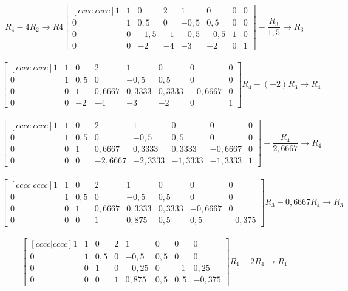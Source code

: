 \\
\[
    R_4 - 4R_2\to R4
    \begin{bmatrix}[cccc|cccc]
        1 & 1 & 0    & 2  & 1    & 0    & 0 & 0 \\
        0 & 1 & 0,5  & 0  & -0,5 & 0,5  & 0 & 0 \\
        0 & 0 & -1,5 & -1 & -0,5 & -0,5 & 1 & 0 \\
        0 & 0 & -2   & -4 & -3   & -2   & 0 & 1
    \end{bmatrix}
    -\frac{R_3}{1,5}\to R_3
\]
\\
\[
    \begin{bmatrix}[cccc|cccc]
        1 & 1 & 0   & 2      & 1      & 0      & 0       & 0 \\
        0 & 1 & 0,5 & 0      & -0,5   & 0,5    & 0       & 0 \\
        0 & 0 & 1   & 0,6667 & 0,3333 & 0,3333 & -0,6667 & 0 \\
        0 & 0 & -2  & -4     & -3     & -2     & 0       & 1
    \end{bmatrix}
    R_4 - (-2)R_3\to R_4
\]
\\
\[
    \begin{bmatrix}[cccc|cccc]
        1 & 1 & 0   & 2       & 1       & 0       & 0       & 0 \\
        0 & 1 & 0,5 & 0       & -0,5    & 0,5     & 0       & 0 \\
        0 & 0 & 1   & 0,6667  & 0,3333  & 0,3333  & -0,6667 & 0 \\
        0 & 0 & 0   & -2,6667 & -2,3333 & -1,3333 & -1,3333 & 1
    \end{bmatrix}
    -\frac{R_4}{2,6667}\to R_4
\]
\\
\[
    \begin{bmatrix}[cccc|cccc]
        1 & 1 & 0   & 2      & 1      & 0      & 0       & 0      \\
        0 & 1 & 0,5 & 0      & -0,5   & 0,5    & 0       & 0      \\
        0 & 0 & 1   & 0,6667 & 0,3333 & 0,3333 & -0,6667 & 0      \\
        0 & 0 & 0   & 1      & 0,875  & 0,5    & 0,5     & -0,375
    \end{bmatrix}
    R_3 - 0,6667R_4 \to R_3
\]
\\
\[
    \begin{bmatrix}[cccc|cccc]
        1 & 1 & 0   & 2 & 1     & 0   & 0   & 0      \\
        0 & 1 & 0,5 & 0 & -0,5  & 0,5 & 0   & 0      \\
        0 & 0 & 1   & 0 & -0,25 & 0   & -1  & 0,25   \\
        0 & 0 & 0   & 1 & 0,875 & 0,5 & 0,5 & -0,375
    \end{bmatrix}
    R_1 - 2R_4 \to R_1
\]
